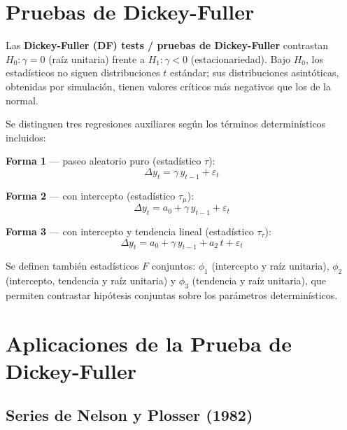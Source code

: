 \documentclass[12pt]{article}
\begin{document}
\section{Pruebas de Dickey-Fuller}

Las \textbf{Dickey-Fuller (DF) tests / pruebas de Dickey-Fuller} contrastan
$H_0\colon \gamma = 0$ (ra\'iz unitaria) frente a $H_1\colon \gamma < 0$
(estacionariedad). Bajo $H_0$, los estad\'isticos no siguen distribuciones
$t$ est\'andar; sus distribuciones asint\'oticas, obtenidas por simulaci\'on,
tienen valores cr\'iticos m\'as negativos que los de la normal.

Se distinguen tres regresiones auxiliares seg\'un los t\'erminos
determin\'isticos incluidos:

\textbf{Forma 1} --- paseo aleatorio puro (estad\'istico $\tau$):
\begin{equation}
  \Delta y_t = \gamma\,y_{t-1} + \varepsilon_t
\end{equation}

\textbf{Forma 2} --- con intercepto (estad\'istico $\tau_\mu$):
\begin{equation}
  \Delta y_t = a_0 + \gamma\,y_{t-1} + \varepsilon_t
\end{equation}

\textbf{Forma 3} --- con intercepto y tendencia lineal
(estad\'istico $\tau_\tau$):
\begin{equation}
  \Delta y_t = a_0 + \gamma\,y_{t-1} + a_2\,t + \varepsilon_t
\end{equation}

Se definen tambi\'en estad\'isticos $F$ conjuntos: $\phi_1$ (intercepto y
ra\'iz unitaria), $\phi_2$ (intercepto, tendencia y ra\'iz unitaria) y
$\phi_3$ (tendencia y ra\'iz unitaria), que permiten contrastar
hip\'otesis conjuntas sobre los par\'ametros determin\'isticos.

\section{Aplicaciones de la Prueba de Dickey-Fuller}

\subsection{Series de Nelson y Plosser (1982)}
\end{document}
